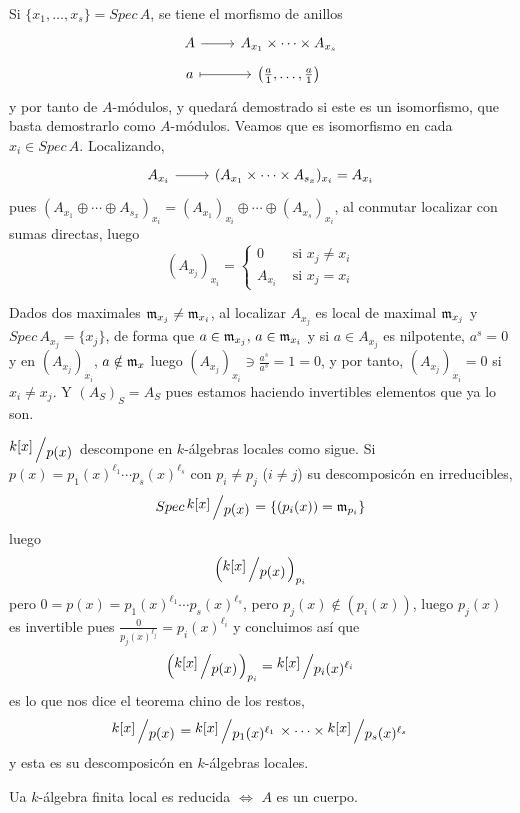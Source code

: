 \begin{dem}
    Si $\{x_1,\ldots, x_s\} = Spec\, A$, se tiene el morfismo de anillos
    $$\bt A \rar & A_{x_1} \times \cdots \times A_{x_s} \\[-5mm] a \rarmaps & \left( \frac{a}{1}, \ldots, \frac{a}{1} \right) \et$$
    y por tanto de $A$-m\'odulos, y quedar\'a demostrado si este es un isomorfismo, que basta demostrarlo como $A$-m\'odulos. Veamos que es isomorfismo en cada $x_i \in Spec\, A$. Localizando, 
    $$\bt A_{x_i} \rar & (A_{x_1} \times \cdots \times A_{s_x})_{x_i} = A_{x_i} \et$$
    pues $(A_{x_1} \oplus \cdots \oplus A_{s_x})_{x_i} = (A_{x_1})_{x_i} \oplus \cdots \oplus (A_{x_s})_{x_i}$, al conmutar localizar con sumas directas, luego
    $$(A_{x_j})_{x_i} = \begin{cases}
        0 & \text{ si } x_j \neq x_i \\  A_{x_i} & \text{ si } x_j = x_i
    \end{cases}$$

    Dados dos maximales $\mathfrak{m}_{x_j} \neq \mathfrak{m}_{x_i}$, al localizar $A_{x_j}$ es local de maximal $\mathfrak{m}_{x_j}$ y $Spec\, A_{x_j} = \{x_j\}$, de forma que $a\in \mathfrak{m}_{x_j}, \, a\in \mathfrak{m}_{x_i}$ y si $a\in A_{x_j}$ es nilpotente, $a^s=0$ y en $(A_{x_j})_{x_i}$, $a\notin \mathfrak{m}_x$ luego $(A_{x_j})_{x_i} \ni \frac{a^s}{a^s} = 1 = 0$, y por tanto, $(A_{x_j})_{x_i} = 0$ si $x_i \neq x_j$. Y $(A_S)_S=A_S$ pues estamos haciendo invertibles elementos que ya lo son.
\end{dem}\begin{ejem}
    $\modulo{k[x]}{p(x)}$ descompone en $k$-\'algebras locales como sigue. Si $p(x) = p_1(x)^{\ell_1} \cdots p_s(x)^{\ell_s}$ con $p_i\neq p_j$ ($i \neq j$) su descomposic\'on en irreducibles, 
    $$Spec\, \modulo{k[x]}{p(x)} = \{(p_i(x)) = \m_{p_i}\}$$
    luego
    $$\left( \modulo{k[x]}{p(x)} \right)_{p_i} $$
    pero $0=p(x) = p_1(x)^{\ell_1} \cdots p_s(x)^{\ell_s}$, pero $p_j(x) \nin (p_i(x))$, luego $p_j(x)$ es invertible pues $\frac{0}{p_j(x)^{\ell_j}} = p_i(x)^{\ell_i}$ y concluimos as\'i que
    $$\left( \modulo{k[x]}{p(x)} \right)_{p_i} = \modulo{k[x]}{p_i(x)^{\ell_i}} $$ 
    es lo que nos dice el teorema chino de los restos,
    $$\modulo{k[x]}{p(x)} =  \modulo{k[x]}{p_1(x)^{\ell_1}} \times \cdots \times \modulo{k[x]}{p_s(x)^{\ell_s}}$$
    y esta es su descomposic\'on en $k$-\'algebras locales.
\end{ejem}
\begin{prop}
    Ua $k$-\'algebra finita local es reducida $\iff$ $A$ es un cuerpo. 
\end{prop}
